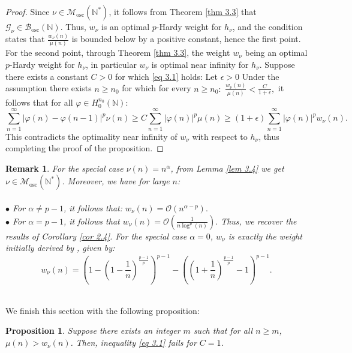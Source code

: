 \documentclass[11pt]{amsart}
\newtheorem{remark}[thm]{Remark}
\newtheorem{prop}[thm]{Proposition}
\newcommand{\1}{[1]}
\def\phi{\varphi}
\begin{document}
\begin{proof}
Since $\nu \in \mathcal{M}_{\text{osc}} (\mathbb{N}^{*})$, it follows from Theorem \ref{thm 3.3} that $\mathcal{G}_{\nu} \in \mathcal{B}_{\text{osc}}(\mathbb{N})$. Thus, $w_{\nu}$ is an optimal $p$-Hardy weight for $h_{\nu}$, and the condition states that  $\frac{w_{\nu}(n)}{\mu(n)}$ is bounded below by a positive constant, hence the first point. For the second point, through Theorem \ref{thm 3.3}, the weight $w_{\nu}$ being an optimal $p$-Hardy weight for $h_{\nu}$, in particular $w_{\nu}$ is optimal near infinity for $h_{\nu}$. Suppose there exists a constant $C > 0$ for which \eqref{eq 3.1} holds: Let $\epsilon >0$ Under the assumption there exists $n \geq n_{0}$ for which for every $n\geq n_{0}:$  $\displaystyle \frac{w_{\nu}(n)}{\mu(n)} < \frac{C}{1+\epsilon},$ it follows that for all $\phi \in H_0^{n_0}(\mathbb{N}):$
$$\sum_{n=1}^{\infty} |\phi(n)-\phi(n-1)|^p \nu(n) \geq C   \sum_{n=1}^{\infty} |\phi(n)|^p \mu(n) \geq (1+\epsilon) \sum_{n=1}^{\infty} |\phi(n)|^p w_{\nu}(n).
$$
This contradicts the optimality near infinity of $w_{\nu}$ with respect to $h_{\nu}$, thus completing the proof of the proposition.
\end{proof}

\begin{remark} \label{rmk 3.6} For the special case $\nu(n) = n^{\alpha}$, from Lemma \ref{lem 3.4} we get $\nu \in \mathcal{M}_{\text{osc}} (\mathbb{N}^{*})$. Moreover, we have for large $n$:  \\  \\
$\bullet$ For $\alpha \neq p-1$, it follows that: $\displaystyle
w_{\nu}(n) \underset{}{=} \mathcal{O} (n^{\alpha-p}).
$\\  
$\bullet$ For $\alpha = p-1$, it follows that $\displaystyle w_{\nu}(n) \underset{}{=} \mathcal{O} \left( \frac{1}{n \log^p (n)} \right).$
Thus, we recover the results of Corollary \ref{cor 2.4}. For the special case $\alpha = 0$, $w_{\nu}$ is exactly the weight initially derived by \cite{FKP23}, given by:
$$
w_{\nu}(n)= \left(1-\left(1-\frac{1}{n}\right)^{\frac{p-1}{p}}\right)^{p-1}-\left(\left(1+\frac{1}{n}\right)^{\frac{p-1}{p}}-1\right)^{p-1}.
$$
\end{remark}
\phantom{.} \\
We finish this section with the following proposition:
\begin{prop} \label{prop 3.7} Suppose there exists an integer $m$ such that for all $n \geq m$, $\mu(n) > w_{\nu}(n) $. Then, inequality \eqref{eq 3.1} fails for $C = 1$.
\end{prop}
\end{document}
